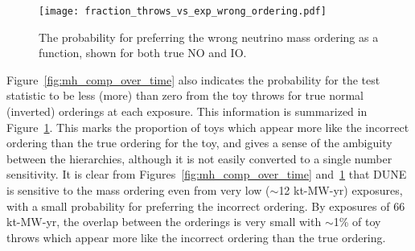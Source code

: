 \begin{figure}[htbp]
  \centering
  \texttt{[image: fraction\_throws\_vs\_exp\_wrong\_ordering.pdf]}
  \caption{The probability for preferring the wrong neutrino mass ordering as a function, shown for both true NO and IO.}
  \label{fig:mh_wrong}
\end{figure}
Figure~\ref{fig:mh_comp_over_time} also indicates the probability for the test statistic \dchisqMO to be less (more) than zero from the toy throws for true normal (inverted) orderings at each exposure. This information is summarized in Figure~\ref{fig:mh_wrong}. This marks the proportion of toys which appear more like the incorrect ordering than the true ordering for the toy, and gives a sense of the ambiguity between the hierarchies, although it is not easily converted to a single number sensitivity. It is clear from Figures~\ref{fig:mh_comp_over_time} and~\ref{fig:mh_wrong} that DUNE is sensitive to the mass ordering even from very low ($\sim$12 kt-MW-yr) exposures, with a small probability for preferring the incorrect ordering. By exposures of 66 kt-MW-yr, the overlap between the orderings is very small with $\sim$1\% of toy throws which appear more like the incorrect ordering than the true ordering.

\begin{figure*}[htbp]
  \centering
  \\
  \caption{Fraction of throws for which the DUNE sensitivity to the mass ordering exceeds 1--5$\sigma$ significance, as a function of the true value of \deltacp. Shown for NO, for a number of different exposures. The number of throws used to make each figure is also shown.}
  \label{fig:mh_nh_over_time}
\end{figure*}

